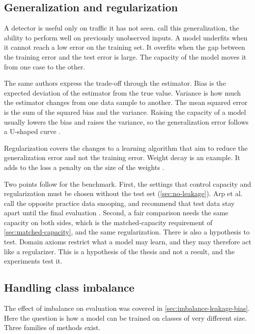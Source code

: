 \subsection{Generalization and regularization}
\label{sec:bias-variance-generalization}

A detector is useful only on traffic it has not seen. \citet{goodfellow2016deep}
call this generalization, the ability to perform well on previously
unobserved inputs. A model underfits when it cannot reach a low error on the
training set. It overfits when the gap between the training error and the
test error is large. The capacity of the model moves it from one case to the
other.

The same authors express the trade-off through the estimator. Bias is the
expected deviation of the estimator from the true value. Variance is how much
the estimator changes from one data sample to another. The mean squared error
is the sum of the squared bias and the variance. Raising the capacity of a
model usually lowers the bias and raises the variance, so the generalization
error follows a U-shaped curve \citep{goodfellow2016deep}.

Regularization covers the changes to a learning algorithm that aim to reduce
the generalization error and not the training error. Weight decay is an
example. It adds to the loss a penalty on the size of the weights
\citep{goodfellow2016deep}.

Two points follow for the benchmark. First, the settings that control
capacity and regularization must be chosen without the test set
(\cref{sec:no-leakage}). Arp et al.
call the opposite practice data snooping, and recommend that test data stay
apart until the final evaluation \citep{arp2022dosdonts}. Second, a fair
comparison needs the same capacity on both sides, which is the
matched-capacity requirement of \cref{sec:matched-capacity}, and the same regularization.
There is also a hypothesis to test. Domain axioms restrict what a model may
learn, and they may therefore act like a regularizer. This is a hypothesis of
the thesis and not a result, and the experiments test it.

\subsection{Handling class imbalance}
\label{sec:imbalance-handling}

The effect of imbalance on evaluation was covered in \cref{sec:imbalance-leakage-bias}.
Here the question is how a model can be trained on classes of very different
size. Three families of methods exist.


